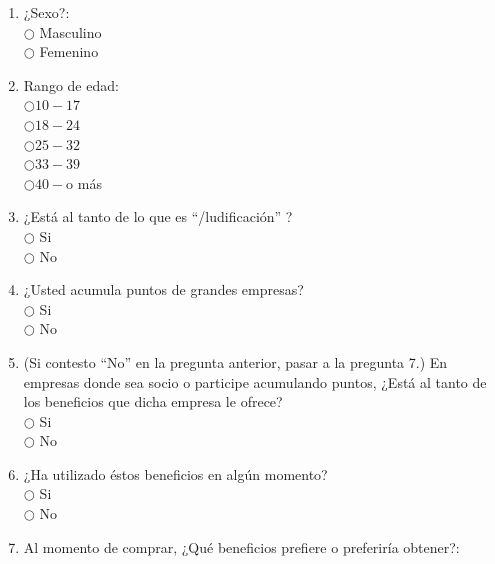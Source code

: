 \label{AnexoI}
\begin{enumerate}

\item ¿Sexo?: \\

$\bigcirc$ Masculino \\
$\bigcirc$ Femenino

\item Rango de edad: \\

$\bigcirc 10 - 17$\\
$\bigcirc 18 - 24$\\
$\bigcirc 25 - 32$\\
$\bigcirc 33 - 39$\\
$\bigcirc 40 - $o más

\item ¿Está al tanto de lo que es ``{\gam}/ludificación'' ? \\

$\bigcirc$ Si \\
$\bigcirc$ No

\item ¿Usted acumula puntos de grandes empresas?\\

$\bigcirc$ Si \\
$\bigcirc$ No    

\item  (Si contesto ``No'' en la pregunta anterior, pasar a la pregunta 7.) En empresas donde sea socio o participe acumulando puntos, ¿Está al tanto de los beneficios que dicha empresa le ofrece?\\

$\bigcirc$ Si \\
$\bigcirc$ No

\item ¿Ha utilizado éstos beneficios en algún momento?\\

$\bigcirc$ Si \\
$\bigcirc$ No

\item Al momento de comprar, ¿Qué beneficios prefiere o preferiría obtener?:


\end{enumerate}
